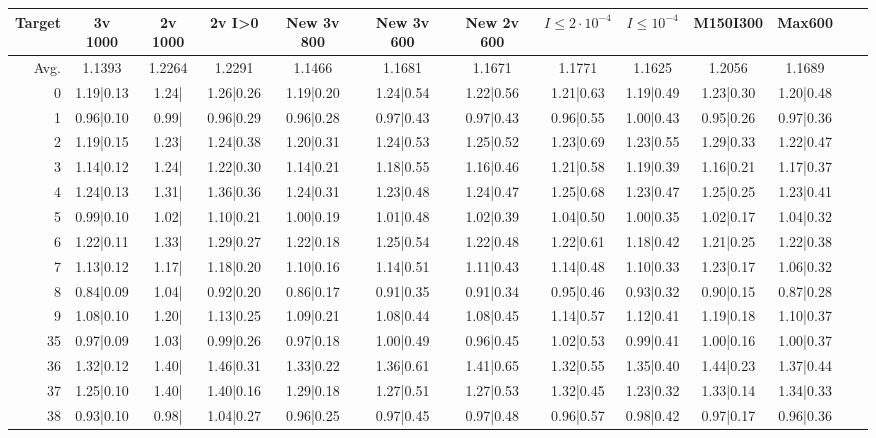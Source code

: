 \begin{table}
	\begin{tabular}{|r||c|c|c|c|c|c|c|c|c|c|c|c|}
\hline
Target & 3v 1000 & 2v 1000 & 2v I>0 & New 3v 800 & New 3v 600 & New 2v 600 & $I\leq 2\cdot 10^{-4}$ & $I\leq 10^{-4}$ & M150I300  & Max600  \\\hline
Avg. & 1.1393 & 1.2264 & 1.2291 & 1.1466 & 1.1681 & 1.1671 & 1.1771 & 1.1625 & 1.2056 & 1.1689  \\\hline
0 &1.19|0.13 &1.24| &1.26|0.26 &1.19|0.20 &1.24|0.54 &1.22|0.56 &1.21|0.63 &1.19|0.49 &1.23|0.30 &1.20|0.48  \\\hline
1 &0.96|0.10 &0.99| &0.96|0.29 &0.96|0.28 &0.97|0.43 &0.97|0.43 &0.96|0.55 &1.00|0.43 &0.95|0.26 &0.97|0.36  \\\hline
2 &1.19|0.15 &1.23| &1.24|0.38 &1.20|0.31 &1.24|0.53 &1.25|0.52 &1.23|0.69 &1.23|0.55 &1.29|0.33 &1.22|0.47  \\\hline
3 &1.14|0.12 &1.24| &1.22|0.30 &1.14|0.21 &1.18|0.55 &1.16|0.46 &1.21|0.58 &1.19|0.39 &1.16|0.21 &1.17|0.37  \\\hline
4 &1.24|0.13 &1.31| &1.36|0.36 &1.24|0.31 &1.23|0.48 &1.24|0.47 &1.25|0.68 &1.23|0.47 &1.25|0.25 &1.23|0.41  \\\hline
5 &0.99|0.10 &1.02| &1.10|0.21 &1.00|0.19 &1.01|0.48 &1.02|0.39 &1.04|0.50 &1.00|0.35 &1.02|0.17 &1.04|0.32  \\\hline
6 &1.22|0.11 &1.33| &1.29|0.27 &1.22|0.18 &1.25|0.54 &1.22|0.48 &1.22|0.61 &1.18|0.42 &1.21|0.25 &1.22|0.38  \\\hline
7 &1.13|0.12 &1.17| &1.18|0.20 &1.10|0.16 &1.14|0.51 &1.11|0.43 &1.14|0.48 &1.10|0.33 &1.23|0.17 &1.06|0.32  \\\hline
8 &0.84|0.09 &1.04| &0.92|0.20 &0.86|0.17 &0.91|0.35 &0.91|0.34 &0.95|0.46 &0.93|0.32 &0.90|0.15 &0.87|0.28  \\\hline
9 &1.08|0.10 &1.20| &1.13|0.25 &1.09|0.21 &1.08|0.44 &1.08|0.45 &1.14|0.57 &1.12|0.41 &1.19|0.18 &1.10|0.37  \\\hline
35 &0.97|0.09 &1.03| &0.99|0.26 &0.97|0.18 &1.00|0.49 &0.96|0.45 &1.02|0.53 &0.99|0.41 &1.00|0.16 &1.00|0.37  \\\hline
36 &1.32|0.12 &1.40| &1.46|0.31 &1.33|0.22 &1.36|0.61 &1.41|0.65 &1.32|0.55 &1.35|0.40 &1.44|0.23 &1.37|0.44  \\\hline
37 &1.25|0.10 &1.40| &1.40|0.16 &1.29|0.18 &1.27|0.51 &1.27|0.53 &1.32|0.45 &1.23|0.32 &1.33|0.14 &1.34|0.33  \\\hline
38 &0.93|0.10 &0.98| &1.04|0.27 &0.96|0.25 &0.97|0.45 &0.97|0.48 &0.96|0.57 &0.98|0.42 &0.97|0.17 &0.96|0.36  \\\hline

\end{tabular}
\end{table}
